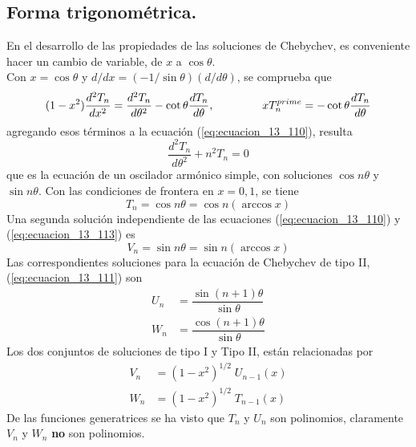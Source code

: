 \subsection{Forma trigonométrica.}
En el desarrollo de las propiedades de las soluciones de Chebychev, es conveniente hacer un cambio de variable, de $x$ a $\cos \theta$.
\\
Con $x = \cos \theta$ y $d /dx = (-1 / \sin \theta) (d / d \theta)$, se comprueba que
\[ (1 -x^{2}) \dfrac{d^{2} T_{n}}{d x^{2}} = \dfrac{d^{2} T_{n}}{d \theta^{2}} - \cot \theta \dfrac{d T_{n}}{d \theta}, \hspace{1.5cm} x T_{n}^{prime} = - \cot \theta \dfrac{d T_{n}}{d \theta} \]
agregando esos términos a la ecuación (\ref{eq:ecuacion_13_110}), resulta
\begin{equation}
\dfrac{d^{2} T_{n}}{d \theta^{2}} + n^{2} T_{n} = 0
\label{eq:ecuacion_13_113}
\end{equation}
que es la ecuación de un oscilador armónico simple, con soluciones $\cos n \theta$ y $\sin n \theta$. Con las condiciones de frontera en $x=0,1$, se tiene
\begin{equation}
T_{n} = \cos n \theta = \cos n (\arccos x)
\label{eq:ecuacion_13_114a}
\end{equation}
Una segunda solución independiente de las ecuaciones (\ref{eq:ecuacion_13_110}) y (\ref{eq:ecuacion_13_113}) es
\begin{equation}
V_{n} = \sin n \theta = \sin n (\arccos x)
\label{eq:ecuacion_13_114b}
\end{equation}
Las correspondientes soluciones para la ecuación de Chebychev de tipo II, (\ref{eq:ecuacion_13_111}) son
\begin{eqnarray}
U_{n} &= \dfrac{\sin (n + 1) \theta}{\sin \theta} \label{eq:ecuacion_13_115a} \\
W_{n} &= \dfrac{\cos (n + 1) \theta}{\sin \theta} \label{eq:ecuacion_13_115b}
\end{eqnarray}
Los dos conjuntos de soluciones de tipo I y Tipo II, están relacionadas por
\begin{eqnarray}
V_{n} &=  (1 - x^{2})^{1/2} \; U_{n-1} (x) \label{eq:ecuacion_13_116a} \\
W_{n} &=  (1 - x^{2})^{1/2} \; T_{n-1} (x) \label{eq:ecuacion_13_116b} 
\end{eqnarray}
De las funciones generatrices se ha visto que $T_{n}$ y $U_{n}$ son polinomios, claramente $V_{n}$ y $W_{n}$ \textbf{no} son polinomios. 

